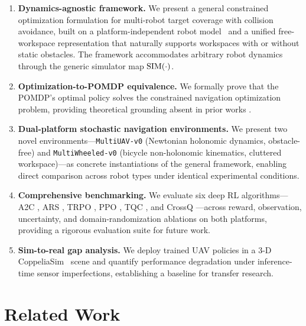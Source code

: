 \documentclass{article}
\begin{document}
\begin{enumerate}
    \item \textbf{Dynamics-agnostic framework.} We present a general constrained optimization formulation for multi-robot target coverage with collision avoidance, built on a platform-independent robot model~\citep{plaku2021} and a unified free-workspace representation that naturally supports workspaces with or without static obstacles. The framework accommodates arbitrary robot dynamics through the generic simulator map $\operatorname{SIM}(\cdot)$.

    \item \textbf{Optimization-to-POMDP equivalence.} We formally prove that the POMDP's optimal policy solves the constrained navigation optimization problem, providing theoretical grounding absent in prior works \citep{chen2017icra, everett2018iros, fan2020ijrr}.

    \item \textbf{Dual-platform stochastic navigation environments.} We present two novel environments---\texttt{MultiUAV-v0} (Newtonian holonomic dynamics, obstacle-free) and \texttt{MultiWheeled-v0} (bicycle non-holonomic kinematics, cluttered workspace)---as concrete instantiations of the general framework, enabling direct comparison across robot types under identical experimental conditions.

    \item \textbf{Comprehensive benchmarking.} We evaluate six deep RL algorithms---A2C \citep{mnih2016a2c}, ARS \citep{mania2018ars}, TRPO \citep{schulman2015trust}, PPO \citep{schulman2017ppo}, TQC \citep{kuznetsov2020tqc}, and CrossQ \citep{bhatt2024crossq}---across reward, observation, uncertainty, and domain-randomization ablations on both platforms, providing a rigorous evaluation suite for future work.

    \item \textbf{Sim-to-real gap analysis.} We deploy trained UAV policies in a 3-D CoppeliaSim~\citep{coppeliaSim2013} scene and quantify performance degradation under inference-time sensor imperfections, establishing a baseline for transfer research.
\end{enumerate}

\section{Related Work}
\label{sec:recent}
\end{document}
